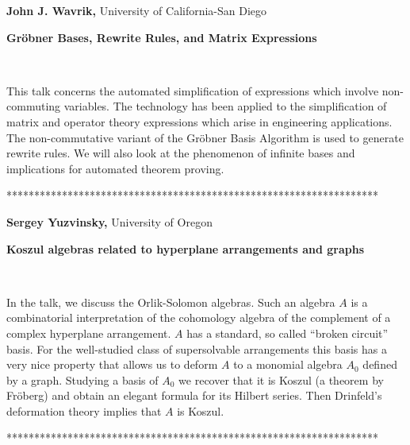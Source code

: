 \documentclass[12pt]{article}
\begin{document}
\noindent \textbf{John J. Wavrik, }University of California-San Diego

\noindent \textbf{Gr\"{o}bner Bases, Rewrite Rules, and Matrix Expressions}

\smallskip\ 

\noindent This talk concerns the automated simplification of expressions
which involve non-commuting variables. The technology has been applied to
the simplification of matrix and operator theory expressions which arise in
engineering applications. The non-commutative variant of the Gr\"{o}bner
Basis Algorithm is used to generate rewrite rules. We will also look at the
phenomenon of infinite bases and implications for automated theorem proving.

\begin{center}
*******************************************************************
\end{center}

\vspace{.1in}

\noindent \textbf{Sergey Yuzvinsky,} University of Oregon

\noindent \textbf{Koszul algebras related to hyperplane arrangements and
graphs}

\smallskip\ 

\noindent In the talk, we discuss the Orlik-Solomon algebras. Such an
algebra $A$ is a combinatorial interpretation of the cohomology algebra of
the complement of a complex hyperplane arrangement. $A$ has a standard, so
called ``broken circuit'' basis. For the well-studied class of supersolvable
arrangements this basis has a very nice property that allows us to deform $A$
to a monomial algebra $A_0$ defined by a graph. Studying a basis of $A_0$ we
recover that it is Koszul (a theorem by Fr\"{o}berg) and obtain an elegant
formula for its Hilbert series. Then Drinfeld's deformation theory implies
that $A$ is Koszul.

\begin{center}
*******************************************************************
\end{center}
\end{document}
